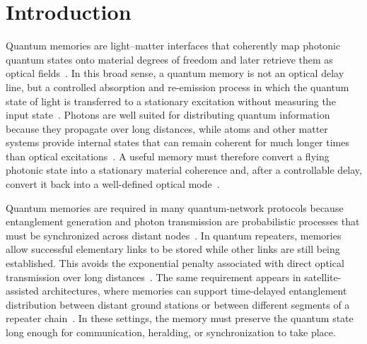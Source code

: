 \chapter{Introduction}

Quantum memories are light--matter interfaces that coherently map photonic quantum states onto material degrees of freedom and later retrieve them as optical fields~\cite{Qmeaara_HeshamiEtAl_2016,AWAVQMitCoSR_Rodriguez_,QmfpDp_FleischhauerEtAl_2002}. In this broad sense, a quantum memory is not an optical delay line, but a controlled absorption and re-emission process in which the quantum state of light is transferred to a stationary excitation without measuring the input state~\cite{Qmeaara_HeshamiEtAl_2016}. Photons are well suited for distributing quantum information because they propagate over long distances, while atoms and other matter systems provide internal states that can remain coherent for much longer times than optical excitations~\cite{QmfpDp_FleischhauerEtAl_2002,Qmeaara_HeshamiEtAl_2016}. A useful memory must therefore convert a flying photonic state into a stationary material coherence and, after a controllable delay, convert it back into a well-defined optical mode~\cite{QmfpDp_FleischhauerEtAl_2002,AWAVQMitCoSR_Rodriguez_}.

Quantum memories are required in many quantum-network protocols because entanglement generation and photon transmission are probabilistic processes that must be synchronized across distant nodes~\cite{Qmeaara_HeshamiEtAl_2016}. In quantum repeaters, memories allow successful elementary links to be stored while other links are still being established. This avoids the exponential penalty associated with direct optical transmission over long distances~\cite{Qmeaara_HeshamiEtAl_2016,Tssqrnfgqc_GundoganEtAl_2024}. The same requirement appears in satellite-assisted architectures, where memories can support time-delayed entanglement distribution between distant ground stations or between different segments of a repeater chain~\cite{Tssqrnfgqc_GundoganEtAl_2024}. In these settings, the memory must preserve the quantum state long enough for communication, heralding, or synchronization to take place.

